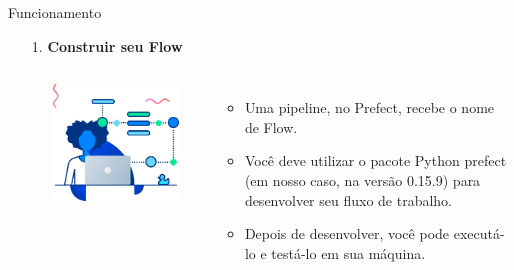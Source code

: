 \documentclass[t,serif]{beamer}
\begin{document}
	\begin{frame}{Funcionamento}
		\begin{enumerate}
			\item[1.] \textbf{Construir seu Flow}
			\begin{columns}
					\\
					\begin{center}
						\includegraphics[width=\linewidth]{figs/2_1.png}
					\end{center}
					\\
					\begin{itemize}
						\item Uma pipeline, no Prefect, recebe o nome de Flow.
						\item Você deve utilizar o pacote Python prefect (em nosso caso, na versão 0.15.9) para desenvolver seu fluxo de trabalho.
						\item Depois de desenvolver, você pode executá-lo e testá-lo em sua máquina.
					\end{itemize}
			\end{columns}
		\end{enumerate}
	\end{frame}
	
\end{document}
